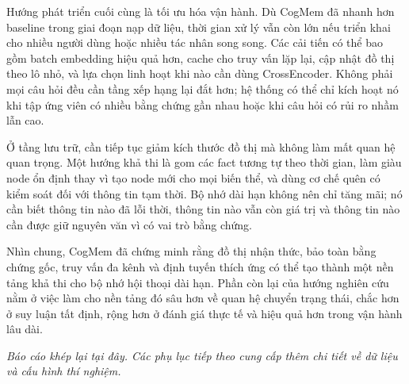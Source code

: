 \documentclass[../main.tex]{subfiles}
\begin{document}
Hướng phát triển cuối cùng là tối ưu hóa vận hành. Dù CogMem đã nhanh hơn baseline trong giai đoạn nạp dữ liệu, thời gian xử lý vẫn còn lớn nếu triển khai cho nhiều người dùng hoặc nhiều tác nhân song song. Các cải tiến có thể bao gồm batch embedding hiệu quả hơn, cache cho truy vấn lặp lại, cập nhật đồ thị theo lô nhỏ, và lựa chọn linh hoạt khi nào cần dùng CrossEncoder. Không phải mọi câu hỏi đều cần tầng xếp hạng lại đắt hơn; hệ thống có thể chỉ kích hoạt nó khi tập ứng viên có nhiều bằng chứng gần nhau hoặc khi câu hỏi có rủi ro nhầm lẫn cao.

Ở tầng lưu trữ, cần tiếp tục giảm kích thước đồ thị mà không làm mất quan hệ quan trọng. Một hướng khả thi là gom các fact tương tự theo thời gian, làm giàu node ổn định thay vì tạo node mới cho mọi biến thể, và dùng cơ chế quên có kiểm soát đối với thông tin tạm thời. Bộ nhớ dài hạn không nên chỉ tăng mãi; nó cần biết thông tin nào đã lỗi thời, thông tin nào vẫn còn giá trị và thông tin nào cần được giữ nguyên văn vì có vai trò bằng chứng.

Nhìn chung, CogMem đã chứng minh rằng đồ thị nhận thức, bảo toàn bằng chứng gốc, truy vấn đa kênh và định tuyến thích ứng có thể tạo thành một nền tảng khả thi cho bộ nhớ hội thoại dài hạn. Phần còn lại của hướng nghiên cứu nằm ở việc làm cho nền tảng đó sâu hơn về quan hệ chuyển trạng thái, chắc hơn ở suy luận tất định, rộng hơn ở đánh giá thực tế và hiệu quả hơn trong vận hành lâu dài.

\vspace{1em}
\noindent\textit{Báo cáo khép lại tại đây. Các phụ lục tiếp theo cung cấp thêm chi tiết về dữ liệu và cấu hình thí nghiệm.}
\end{document}
